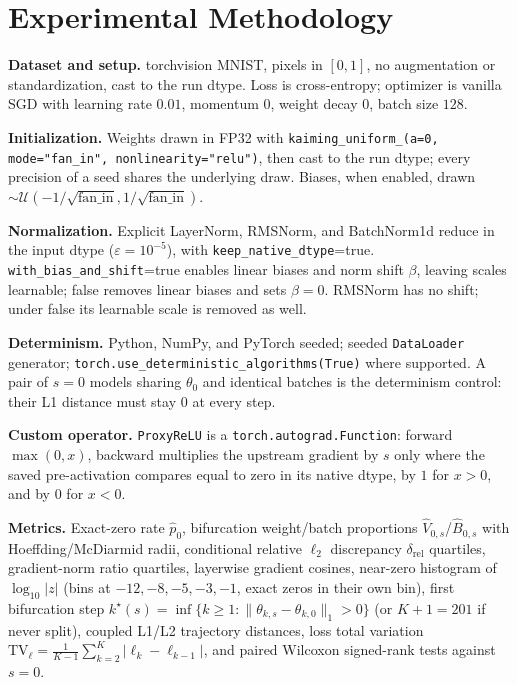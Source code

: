 \documentclass[11pt]{article}
\begin{document}
\section{Experimental Methodology}\label{sec:methodology}

\textbf{Dataset and setup.} torchvision MNIST, pixels in $[0,1]$, no augmentation or standardization, cast to the run dtype. Loss is cross-entropy; optimizer is vanilla SGD with learning rate $0.01$, momentum $0$, weight decay $0$, batch size $128$.

\textbf{Initialization.} Weights drawn in FP32 with \texttt{kaiming\_uniform\_(a=0, mode="fan\_in", nonlinearity="relu")}, then cast to the run dtype; every precision of a seed shares the underlying draw. Biases, when enabled, drawn $\sim\mathcal{U}(-1/\sqrt{\mathrm{fan\_in}},1/\sqrt{\mathrm{fan\_in}})$.

\textbf{Normalization.} Explicit LayerNorm, RMSNorm, and BatchNorm1d reduce in the input dtype ($\varepsilon=10^{-5}$), with \texttt{keep\_native\_dtype}=true. \texttt{with\_bias\_and\_shift}=true enables linear biases and norm shift $\beta$, leaving scales learnable; false removes linear biases and sets $\beta=0$. RMSNorm has no shift; under false its learnable scale is removed as well.

\textbf{Determinism.} Python, NumPy, and PyTorch seeded; seeded \texttt{DataLoader} generator; \texttt{torch.use\_deterministic\_algorithms(True)} where supported. A pair of $s=0$ models sharing $\theta_0$ and identical batches is the determinism control: their L1 distance must stay $0$ at every step.

\textbf{Custom operator.} \texttt{ProxyReLU} is a \texttt{torch.autograd.Function}: forward $\max(0,x)$, backward multiplies the upstream gradient by $s$ only where the saved pre-activation compares equal to zero in its native dtype, by $1$ for $x>0$, and by $0$ for $x<0$.

\textbf{Metrics.} Exact-zero rate $\hat p_0$, bifurcation weight/batch proportions $\hat V_{0,s}$/$\hat B_{0,s}$ with Hoeffding/McDiarmid radii, conditional relative $\ell_2$ discrepancy $\delta_{\mathrm{rel}}$ quartiles, gradient-norm ratio quartiles, layerwise gradient cosines, near-zero histogram of $\log_{10}|z|$ (bins at $-12,-8,-5,-3,-1$, exact zeros in their own bin), first bifurcation step $k^\star(s)=\inf\{k\ge1:\|\theta_{k,s}-\theta_{k,0}\|_1>0\}$ (or $K+1=201$ if never split), coupled L1/L2 trajectory distances, loss total variation $\mathrm{TV}_\ell=\frac1{K-1}\sum_{k=2}^K|\ell_k-\ell_{k-1}|$, and paired Wilcoxon signed-rank tests against $s=0$.
\end{document}
